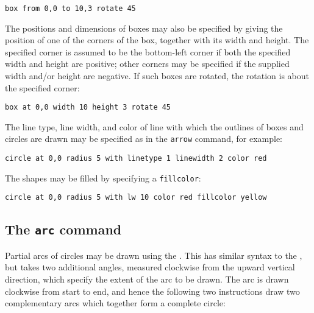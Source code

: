 \begin{verbatim}
box from 0,0 to 10,3 rotate 45
\end{verbatim}

The positions and dimensions of boxes may also be specified by giving the
position of one of the corners of the box, together with its width and height.
The specified corner is assumed to be the bottom-left corner if both the
specified width and height are positive; other corners may be specified if the
supplied width and/or height are negative. If such boxes are rotated, the
rotation is about the specified corner:

\begin{verbatim}
box at 0,0 width 10 height 3 rotate 45
\end{verbatim}

The line type, line width, and color of line with which the outlines of boxes
and circles are drawn may be specified as in the {\tt arrow} command, for
example:

\begin{verbatim}
circle at 0,0 radius 5 with linetype 1 linewidth 2 color red
\end{verbatim}

\noindent The shapes may be filled by specifying a {\tt fillcolor}:

\begin{verbatim}
circle at 0,0 radius 5 with lw 10 color red fillcolor yellow
\end{verbatim}


\subsection{The {\tt arc} command}
\label{sec:arc}

Partial arcs of circles may be drawn using the . This has similar
syntax to the , but takes two additional angles, measured
clockwise from the upward vertical direction, which specify the extent of the
arc to be drawn. The arc is drawn clockwise from start to end, and hence the
following two instructions draw two complementary arcs which together form a
complete circle:


